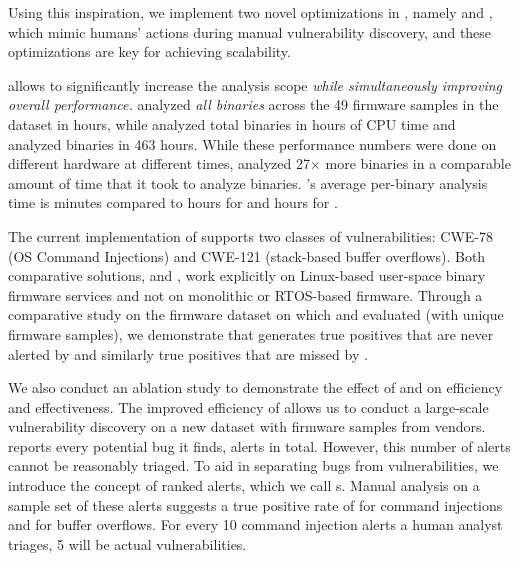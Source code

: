 Using this inspiration, we implement two novel optimizations in \rda, namely \emph{\rev} and \emph{\assumed}, which mimic humans' actions during manual vulnerability discovery, and these optimizations are key for achieving scalability.

\rda allows \mango to significantly increase the analysis scope \emph{while simultaneously improving overall performance.}
\mango analyzed \emph{all \mangoKaronteBinaries binaries} across the 49 firmware samples in the \karonte dataset in \mangoCompTotalTimeHours hours, while \satc analyzed \satcTotalAnalyzedBins total binaries in \satcCompTotalTimeHours hours of CPU time and \karonte analyzed \karonteAnalyzedBinaries binaries in 463 hours.
While these performance numbers were done on different hardware at different times, \mango analyzed 27$\times$ more binaries in a comparable amount of time that it took \satc to analyze \satcTotalAnalyzedBins binaries.
\mango's average per-binary analysis time is \mangoavgtime minutes compared to \SaTCTimePerBin hours for \satc and \karonteTimePerBin hours for \karonte.

The current implementation of \mango supports two classes of vulnerabilities:
CWE-78 (OS Command Injections) and CWE-121 (stack-based buffer overflows).
Both comparative solutions, \karonte and \satc, work explicitly on Linux-based user-space binary firmware services and not on monolithic or RTOS-based firmware.
Through a comparative study on the firmware dataset on which \satc and \karonte evaluated (with \karontesize unique firmware samples), we demonstrate that \mango generates \satcFalseNegatives true positives that are never alerted by \satc and similarly \karonteFalseNegatives true positives that are missed by \karonte.

We also conduct an ablation study to demonstrate the effect of \rev and \assumed on efficiency and effectiveness.
The improved efficiency of \mango allows us to conduct a large-scale vulnerability discovery on a new dataset with \ldsize firmware samples from \ldvendors vendors.
\mango reports every potential bug it finds, \mangoTotalAlerts alerts in total.
However, this number of alerts cannot be reasonably triaged.
To aid in separating bugs from vulnerabilities, we introduce the concept of ranked alerts, which we call \trupoc{}s.
Manual analysis on a sample set of these alerts suggests a true positive rate of \mangocmdiTP for command injections and \mangooverflowTP for buffer overflows. 
For every 10 command injection alerts a human analyst triages, 5 will be actual vulnerabilities.

